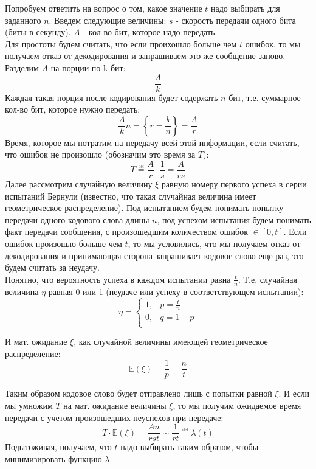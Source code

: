\documentclass[12pt]{article}
\newcommand{\E}{\mathbb{E}}
\newcommand{\defeq}{\overset{\underset{\mathrm{def}}{}}{=}}
\begin{document}
            Попробуем ответить на вопрос о том, какое значение $t$ надо выбирать для заданного $n$. Введем следующие величины: $s$ - скорость передачи одного бита (биты в секунду). $A$ - кол-во бит, которое надо передать. \\

            Для простоты будем считать, что если проихошло больше чем $t$ ошибок, то мы получаем отказ от декодирования и запрашиваем это же сообщение заново. \\

            Разделим $A$ на порции по k бит:
            $$
                \frac{A}{k}
            $$
            Каждая такая порция после кодирования будет содержать $n$ бит, т.е. суммарное кол-во бит, которое нужно передать:
            $$
                \frac{A}{k}n = \left\{r=\frac{k}{n}\right\} =  \frac{A}{r}
            $$
            Время, которое мы потратим на передачу всей этой информации, если считать, что ошибок не произошло (обозначим это время за $T$):
            $$
                T \defeq \frac{A}{r}\cdot\frac{1}{s} = \frac{A}{rs}
            $$
            Далее рассмотрим случайную величину $\xi$ равную номеру первого успеха в серии испытаний Бернули (известно, что такая случайная величина имеет геометрическое распределение). Под испытанием будем понимать попытку передачи одного кодового слова длины $n$, под успехом испытания будем понимать факт передачи сообщения, с произошедшим количеством ошибок $\in [0, t]$. Если ошибок произошло больше чем $t$, то мы условились, что мы получаем отказ от декодирования и принимающая сторона запрашивает кодовое слово еще раз, это будем считать за неудачу. \\

            Понятно, что вероятность успеха в каждом испытании равна $\frac{t}{n}$. Т.е. случайная величина $\eta$ равная 0 или 1 (неудаче или успеху в соответствующем испытании):
            $$
                \eta = \left\{\begin{array}{ll}
                    1, & p = \frac{t}{n} \\
                    0, & q = 1 - p \\
                \end{array}\right.
            $$

            И мат. ожидание $\xi$, как случайной величины имеющей геометрическое распределение:
            $$
                \E(\xi) = \frac{1}{p} = \frac{n}{t}
            $$

            Таким образом кодовое слово будет отправлено лишь с попытки равной $\xi$. И если мы умножим $T$ на мат. ожидание величины $\xi$, то мы получим ожидаемое время передачи с учетом произошедших неуспехов при передаче:
            $$
                T\cdot\E(\xi) = \frac{An}{rst} \sim \frac{1}{rt} \defeq \lambda(t)
            $$
            Подытоживая, получаем, что $t$ надо выбирать таким образом, чтобы минимизировать функцию $\lambda$. \\
\end{document}
